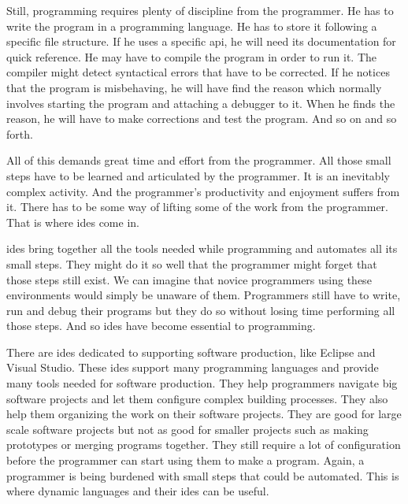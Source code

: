 \documentclass{./llncs2e/llncs}
\begin{document}
	Still, programming requires plenty of discipline from the programmer.
	He has to write the program in a programming language.
	He has to store it following a specific file structure.
	If he uses a specific \ac{api}, he will need its documentation for quick reference.
	He may have to compile the program in order to run it.
	The compiler might detect syntactical errors that have to be corrected.
	If he notices that the program is misbehaving, he will have find the reason which normally involves starting the program and attaching a debugger to it.
	When he finds the reason, he will have to make corrections and test the program.
	And so on and so forth.

	All of this demands great time and effort from the programmer.
	All those small steps have to be learned and articulated by the programmer.
	It is an inevitably complex activity.
	And the programmer's productivity and enjoyment suffers from it.
	There has to be some way of lifting some of the work from the programmer.
	That is where \ac{ide}s come in.

	\ac{ide}s bring together all the tools needed while programming and automates all its small steps.
	They might do it so well that the programmer might forget that those steps still exist.
	We can imagine that novice programmers using these environments would simply be unaware of them.
	Programmers still have to write, run and debug their programs but they do so without losing time performing all those steps.
	And so \ac{ide}s have become essential to programming.
	
	There are \ac{ide}s dedicated to supporting software production, like Eclipse\cite{eclipse2007eclipse} and Visual Studio\cite{mvs2002mvs}.
	These \ac{ide}s support many programming languages and provide many tools needed for software production.
	They help programmers navigate big software projects and let them configure complex building processes.
	They also help them organizing the work on their software projects.
	They are good for large scale software projects but not as good for smaller projects such as making prototypes or merging programs together.
	They still require a lot of configuration before the programmer can start using them to make a program.
	Again, a programmer is being burdened with small steps that could be automated.
	This is where dynamic languages and their \ac{ide}s can be useful.
\end{document}
